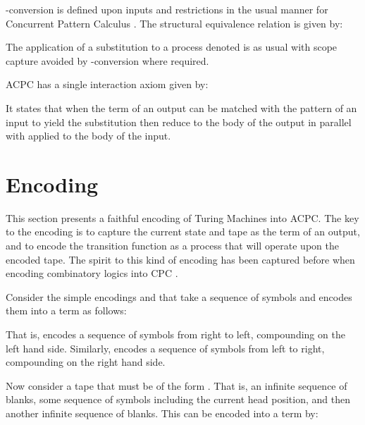 \documentclass[submission,copyright,creativecommons]{eptcs}
\begin{document}
-conversion  is defined upon inputs and restrictions in the usual manner for 
Concurrent Pattern Calculus \cite{GivenWilsonGorlaJay10}.
The structural equivalence relation  is given by:


The application of a substitution  to a process  denoted  is
as usual with scope capture avoided by -conversion where required.

ACPC has a single interaction axiom given by:

It states that when the term of an output can be matched with the pattern of an input to
yield the substitution  then reduce to the body of the output in parallel with
 applied to the body of the input.



\section{Encoding}
\label{sec:enc}

\newcommand{\enclist}[2]{#2} 
This section presents a faithful encoding of Turing Machines into ACPC.
The key to the encoding is to capture the current state and tape as the term of
an output, and to encode the transition function as a process that will operate
upon the encoded tape.
The spirit to this kind of encoding has been captured before when encoding
combinatory logics into CPC \cite{GivenWilsonPhD}.

Consider the simple encodings  and  that take a sequence of symbols
and encodes them into a term as follows:
\enclist{

That is,  encodes a sequence of symbols (to be from the left hand side of
the current head position) into a list starting with the symbol on the right (closest to the current
head position) at the head of the list.
Similarly,  encodes a sequence of symbols (from the right hand side of
the current head position) into a list starting from the symbol on the left (again, closest to the current
head position).
}
{

That is,  encodes a sequence of symbols from right to left, compounding
on the left hand side.
Similarly,  encodes a sequence of symbols from left to right,
compounding on the right hand side.
}

Now consider a tape that must be of the form
.
That is, an infinite sequence of blanks, some sequence of symbols including the current
head position, and then another infinite sequence of blanks.
This can be encoded  into a term by:
\end{document}

